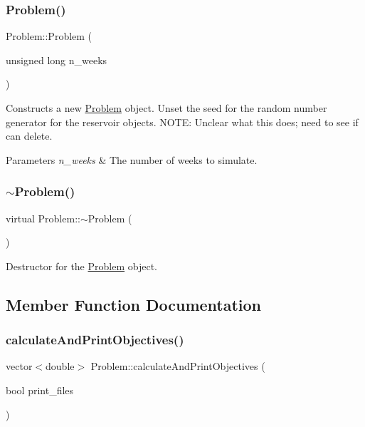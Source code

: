\subsubsection{\texorpdfstring{Problem()}{Problem()}}
{\footnotesize\ttfamily Problem\+::\+Problem (\begin{DoxyParamCaption}\item[{unsigned long}]{n\+\_\+weeks }\end{DoxyParamCaption})}



Constructs a new \mbox{\hyperlink{classProblem}{Problem}} object. Unset the seed for the random number generator for the reservoir objects. N\+O\+TE\+: Unclear what this does; need to see if can delete. 


\begin{DoxyParams}{Parameters}
{\em n\+\_\+weeks} & The number of weeks to simulate. \\
\hline
\end{DoxyParams}
\mbox{\label{classProblem_af175051c1f08660690573aa0021e4106}} 
\subsubsection{\texorpdfstring{$\sim$\+Problem()}{~Problem()}}
{\footnotesize\ttfamily virtual Problem\+::$\sim$\+Problem (\begin{DoxyParamCaption}{ }\end{DoxyParamCaption})\hspace{0.3cm}{\ttfamily [virtual]}}



Destructor for the \mbox{\hyperlink{classProblem}{Problem}} object. 



\subsection{Member Function Documentation}
\mbox{\label{classProblem_a195a32a960235513064a089c2472b44f}} 
\subsubsection{\texorpdfstring{calculate\+And\+Print\+Objectives()}{calculateAndPrintObjectives()}}
{\footnotesize\ttfamily vector$<$double$>$ Problem\+::calculate\+And\+Print\+Objectives (\begin{DoxyParamCaption}\item[{bool}]{print\+\_\+files }\end{DoxyParamCaption})}



